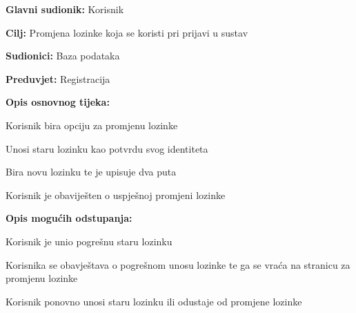 				\noindent {}
				\begin{packed_item}
					
					\item \textbf{Glavni sudionik: } Korisnik
					\item  \textbf{Cilj:} Promjena lozinke koja se koristi pri prijavi u sustav
					\item  \textbf{Sudionici:} Baza podataka
					\item  \textbf{Preduvjet:} Registracija
					\item  \textbf{Opis osnovnog tijeka:}
					
					\item[] \begin{packed_enum}
						
						\item Korisnik bira opciju za promjenu lozinke
						\item Unosi staru lozinku kao potvrdu svog identiteta
						\item Bira novu lozinku te je upisuje dva puta
						\item Korisnik je obaviješten o uspješnoj promjeni lozinke
					\end{packed_enum}
					
					\item  \textbf{Opis mogućih odstupanja:}
					
					\item[] \begin{packed_item}
						
						\item[2.a] Korisnik je unio pogrešnu staru lozinku
						\item[] \begin{packed_enum}
							
							\item Korisnika se obavještava o pogrešnom unosu lozinke te ga se vraća na stranicu za promjenu lozinke
							\item Korisnik ponovno unosi staru lozinku ili odustaje od promjene lozinke
							
						\end{packed_enum}
					\end{packed_item}
				\end{packed_item}
				

